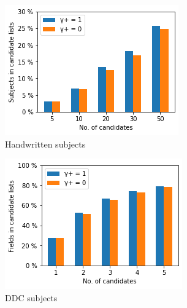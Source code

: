 \begin{figure}
  \begin{subfigure}[t]{.32\textwidth}
    \centering
    \includegraphics[width=\textwidth]{figures/supervised_approach/asl_pos_hw.png}
    \caption{Handwritten subjects}
    \label{fig:asl_pos_hw}
  \end{subfigure}
  \begin{subfigure}[t]{.32\textwidth}
    \centering
    \includegraphics[width=\textwidth]{figures/supervised_approach/asl_pos_ddc.png}
    \caption{DDC subjects}
    \label{fig:asl_pos_ddc}
  \end{subfigure}
   \begin{subfigure}[t]{.32\textwidth}
    \centering

\end{subfigure}
\end{figure}
